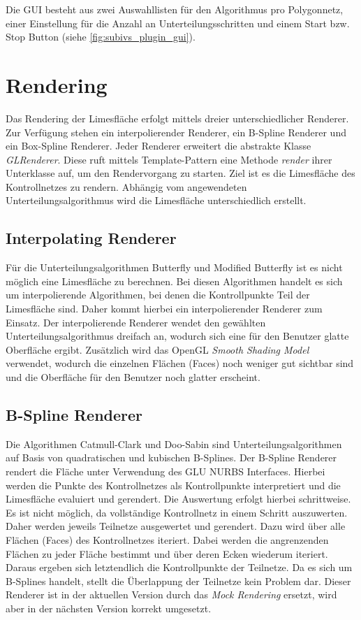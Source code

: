Die GUI besteht aus zwei Auswahllisten für den Algorithmus pro Polygonnetz, einer Einstellung für die Anzahl an Unterteilungsschritten und einem Start bzw. Stop Button (siehe \autoref{fig:subivs_plugin_gui}).

\section{Rendering}
Das Rendering der Limesfläche erfolgt mittels dreier unterschiedlicher Renderer.
Zur Verfügung stehen ein interpolierender Renderer, ein B-Spline Renderer und ein Box-Spline Renderer.
Jeder Renderer erweitert die abstrakte Klasse \emph{GLRenderer}. 
Diese ruft mittels Template-Pattern eine Methode \emph{render} ihrer Unterklasse auf, um den Rendervorgang zu starten.
Ziel ist es die Limesfläche des Kontrollnetzes zu rendern.
Abhängig vom angewendeten Unterteilungsalgorithmus wird die Limesfläche unterschiedlich erstellt.

\subsection{Interpolating Renderer}
Für die Unterteilungsalgorithmen Butterfly und Modified Butterfly ist es nicht möglich eine Limesfläche zu berechnen.
Bei diesen Algorithmen handelt es sich um interpolierende Algorithmen, bei denen die Kontrollpunkte Teil der Limesfläche sind.
Daher kommt hierbei ein interpolierender Renderer zum Einsatz.
Der interpolierende Renderer wendet den gewählten Unterteilungsalgorithmus dreifach an, wodurch sich eine für den Benutzer glatte Oberfläche ergibt. 
Zusätzlich wird das OpenGL \textit{Smooth Shading Model} verwendet, wodurch die einzelnen Flächen (Faces) noch weniger gut sichtbar sind und die Oberfläche für den Benutzer noch glatter erscheint.

\subsection{B-Spline Renderer}
Die Algorithmen Catmull-Clark und Doo-Sabin sind Unterteilungsalgorithmen auf Basis von quadratischen und kubischen B-Splines.
Der B-Spline Renderer rendert die Fläche unter Verwendung des GLU NURBS Interfaces.
Hierbei werden die Punkte des Kontrollnetzes als Kontrollpunkte interpretiert und die Limesfläche evaluiert und gerendert.
Die Auswertung erfolgt hierbei schrittweise.
Es ist nicht möglich, da vollständige Kontrollnetz in einem Schritt auszuwerten.
Daher werden jeweils Teilnetze ausgewertet und gerendert.
Dazu wird über alle Flächen (Faces) des Kontrollnetzes iteriert.
Dabei werden die angrenzenden Flächen zu jeder Fläche bestimmt und über deren Ecken wiederum iteriert.
Daraus ergeben sich letztendlich die Kontrollpunkte der Teilnetze.
Da es sich um B-Splines handelt, stellt die Überlappung der Teilnetze kein Problem dar.
Dieser Renderer ist in der aktuellen Version durch das \textit{Mock Rendering} ersetzt, wird aber in der nächsten Version korrekt umgesetzt.

